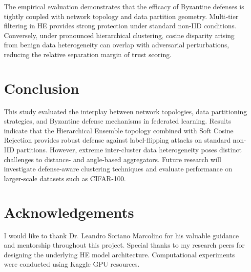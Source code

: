 \documentclass[11pt, a4paper]{article}
\begin{document}
The empirical evaluation demonstrates that the efficacy of Byzantine defenses is tightly coupled with network topology and data partition geometry. Multi-tier filtering in HE provides strong protection under standard non-IID conditions. Conversely, under pronounced hierarchical clustering, cosine disparity arising from benign data heterogeneity can overlap with adversarial perturbations, reducing the relative separation margin of trust scoring.

\FloatBarrier

\section{Conclusion}
This study evaluated the interplay between network topologies, data partitioning strategies, and Byzantine defense mechanisms in federated learning. Results indicate that the Hierarchical Ensemble topology combined with Soft Cosine Rejection provides robust defense against label-flipping attacks on standard non-IID partitions. However, extreme inter-cluster data heterogeneity poses distinct challenges to distance- and angle-based aggregators. Future research will investigate defense-aware clustering techniques and evaluate performance on larger-scale datasets such as CIFAR-100.

\section{Acknowledgements}
I would like to thank Dr. Leandro Soriano Marcolino for his valuable guidance and mentorship throughout this project. Special thanks to my research peers for designing the underlying HE model architecture. Computational experiments were conducted using Kaggle GPU resources.
\end{document}
